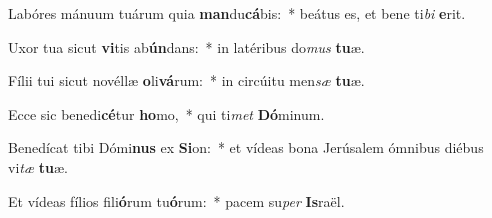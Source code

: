 \item Labóres mánuum tuárum quia \textbf{man}du\textbf{cá}bis:~* beátus es, et bene ti\textit{bi} \textbf{e}rit.
\item Uxor tua sicut \textbf{vi}tis ab\textbf{ún}dans:~* in latéribus do\textit{mus} \textbf{tu}æ.
\item Fílii tui sicut novéllæ \textbf{o}li\textbf{vá}rum:~* in circúitu men\textit{sæ} \textbf{tu}æ.
\item Ecce sic benedi\textbf{cé}tur \textbf{ho}mo,~* qui ti\textit{met} \textbf{Dó}minum.
\item Benedícat tibi Dómi\textbf{nus} ex \textbf{Si}on:~* et vídeas bona Jerúsalem ómnibus diébus vi\textit{tæ} \textbf{tu}æ.
\item Et vídeas fílios fili\textbf{ó}rum tu\textbf{ó}rum:~* pacem su\textit{per} \textbf{Is}raël.
